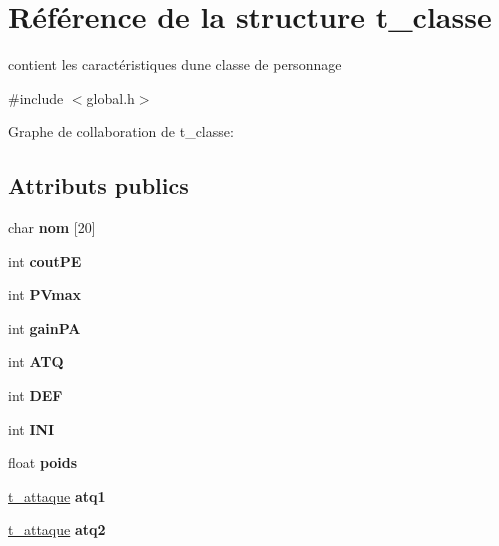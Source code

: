 \hypertarget{a00005}{}\section{Référence de la structure t\+\_\+classe}
\label{a00005}


contient les caractéristiques d\textquotesingle{}une classe de personnage  




{\ttfamily \#include $<$global.\+h$>$}



Graphe de collaboration de t\+\_\+classe\+:
\subsection*{Attributs publics}
\begin{DoxyCompactItemize}
\item 
char {\bfseries nom} \mbox{[}20\mbox{]}\hypertarget{a00005_ab0080d83cb0a2a9ceb8f05dfba32eb99}{}\label{a00005_ab0080d83cb0a2a9ceb8f05dfba32eb99}

\item 
int {\bfseries cout\+PE}\hypertarget{a00005_ac6a9f7551a009405a9fe75130c75ea74}{}\label{a00005_ac6a9f7551a009405a9fe75130c75ea74}

\item 
int {\bfseries P\+Vmax}\hypertarget{a00005_a4694d05e9b9fa7deba7e67dc0c093851}{}\label{a00005_a4694d05e9b9fa7deba7e67dc0c093851}

\item 
int {\bfseries gain\+PA}\hypertarget{a00005_aa2be187b419f9e884889ee3a59a56e8a}{}\label{a00005_aa2be187b419f9e884889ee3a59a56e8a}

\item 
int {\bfseries A\+TQ}\hypertarget{a00005_a13807c477ce6b05bc07fa27d8224c4c0}{}\label{a00005_a13807c477ce6b05bc07fa27d8224c4c0}

\item 
int {\bfseries D\+EF}\hypertarget{a00005_a7557c6f15618a9e93e9f928f6c5181bf}{}\label{a00005_a7557c6f15618a9e93e9f928f6c5181bf}

\item 
int {\bfseries I\+NI}\hypertarget{a00005_a9bc332f2c45ee66f04571b0470a56899}{}\label{a00005_a9bc332f2c45ee66f04571b0470a56899}

\item 
float {\bfseries poids}\hypertarget{a00005_aae98a775f3eec5f23b41616c66b2dcfb}{}\label{a00005_aae98a775f3eec5f23b41616c66b2dcfb}

\item 
\hyperlink{a00004}{t\+\_\+attaque} {\bfseries atq1}\hypertarget{a00005_afee4c531e910b8bd686953747c9ec56c}{}\label{a00005_afee4c531e910b8bd686953747c9ec56c}

\item 
\hyperlink{a00004}{t\+\_\+attaque} {\bfseries atq2}\hypertarget{a00005_aac3cf4fe6b81f0c19e523fc11b6573f3}{}\label{a00005_aac3cf4fe6b81f0c19e523fc11b6573f3}

\end{DoxyCompactItemize}


